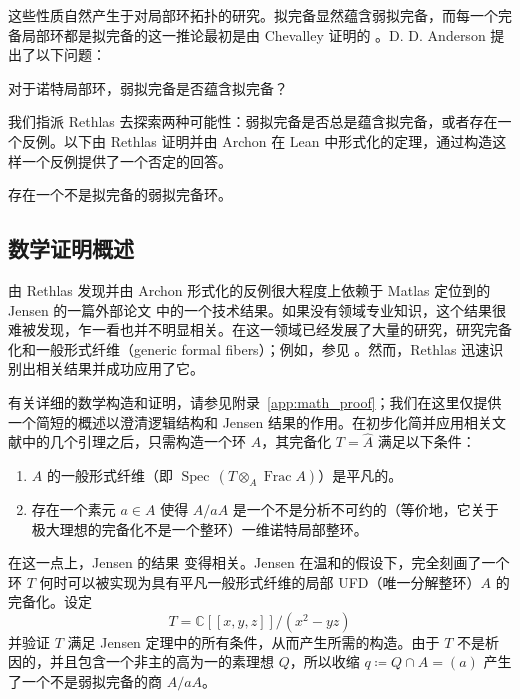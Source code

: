 这些性质自然产生于对局部环拓扑的研究。拟完备显然蕴含弱拟完备，而每一个完备局部环都是拟完备的这一推论最初是由 Chevalley 证明的 \cite[Lemma 7]{chevalley1943theory}。D. D. Anderson 提出了以下问题：

\begin{problem*}
对于诺特局部环，弱拟完备是否蕴含拟完备？
\end{problem*}

我们指派 Rethlas 去探索两种可能性：弱拟完备是否总是蕴含拟完备，或者存在一个反例。以下由 Rethlas 证明并由 Archon 在 Lean 中形式化的定理，通过构造这样一个反例提供了一个否定的回答。

\begin{theorem}\label{thm:main}
    存在一个不是拟完备的弱拟完备环。
\end{theorem}

\subsection{数学证明概述}\label{subsec:nl_proof_sketch}


由 Rethlas 发现并由 Archon 形式化的反例很大程度上依赖于 Matlas 定位到的 Jensen 的一篇外部论文 \cite{jensen2006completions} 中的一个技术结果。如果没有领域专业知识，这个结果很难被发现，乍一看也并不明显相关。在这一领域已经发展了大量的研究，研究完备化和一般形式纤维（generic formal fibers）；例如，参见 \cite{heitmann1993characterization, loepp1997constructing, jensen2006completions, fleming2019completely}。然而，Rethlas 迅速识别出相关结果并成功应用了它。

有关详细的数学构造和证明，请参见附录~\ref{app:math_proof}；我们在这里仅提供一个简短的概述以澄清逻辑结构和 Jensen 结果的作用。在初步化简并应用相关文献中的几个引理之后，只需构造一个环 \(A\)，其完备化 \(T = \widehat A\) 满足以下条件：
\begin{enumerate}[leftmargin=*]
\item[A.] \(A\) 的一般形式纤维（即 \(\operatorname{Spec}\, (T \otimes_{A} \operatorname{Frac} A)\)）是平凡的。
\item[B.] 存在一个素元 \(a \in A\) 使得 \(A/aA\) 是一个不是分析不可约的（等价地，它关于极大理想的完备化不是一个整环）一维诺特局部整环。
\end{enumerate}

在这一点上，Jensen 的结果 \cite[Corollary 2.4]{jensen2006completions} 变得相关。Jensen 在温和的假设下，完全刻画了一个环 \(T\) 何时可以被实现为具有平凡一般形式纤维的局部 UFD（唯一分解整环）\(A\) 的完备化。设定
\[
T = \mathbb{C}[[x,y,z]]/(x^2 - yz)
\]
并验证 \(T\) 满足 Jensen 定理中的所有条件，从而产生所需的构造。由于 \(T\) 不是析因的，并且包含一个非主的高为一的素理想 \(Q\)，所以收缩 $q \coloneqq Q \cap A = (a)$ 产生了一个不是弱拟完备的商 \(A/aA\)。

